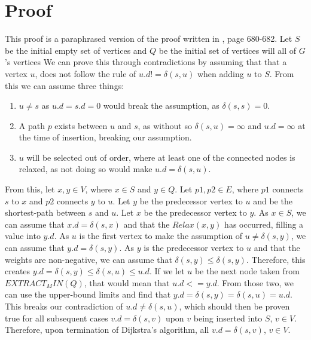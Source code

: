 \documentclass[12pt]{article}
\begin{document}
\section*{Proof}
This proof is a paraphrased version of the proof written in \cite{cormen2009introduction}, page 680-682.  \hfill \break
Let $S$ be the initial empty set of vertices and $Q$ be the initial set of vertices will all of $G$'s vertices
We can prove this through contradictions by assuming that that a vertex $u$, does not follow the rule of $u.d != \delta(s, u)$ when adding $u$ to $S$. From this we can assume three things:

\begin{enumerate}
    \item $u \neq s$ as $u.d = s.d = 0$ would break the assumption, as $\delta(s, s) = 0$.
    \item A path $p$ exists between $u$ and $s$, as without so $\delta(s, u) = \infty$ and $u.d = \infty$ at the time of insertion, breaking our assumption.
    \item $u$ will be selected out of order, where at least one of the connected nodes is relaxed, as not doing so would make $u.d = \delta(s, u)$.
\end{enumerate}
From this, let $x, y \in V$, where $x \in S$ and $y \in Q$. Let $p1, p2 \in E$, where $p1$ connects $s$ to $x$ and $p2$ connects $y$ to $u$. \hfill \break
Let $y$ be the predecessor vertex to $u$ and be the shortest-path between $s$ and $u$. Let $x$ be the predecessor vertex to $y$. \hfill \break
As $x \in S$, we can assume that $x.d = \delta(s, x)$ and that the $Relax(x, y)$ has occurred, filling a value into $y.d$. As $u$ is the first vertex to make the assumption of $u \neq \delta(s, y)$, we can assume that $y.d = \delta(s, y)$. As $y$ is the predecessor vertex to $u$ and that the weights are non-negative, we can assume that $\delta(s, y) \le \delta(s, y)$. Therefore, this creates $y.d = \delta(s, y) \le \delta(s, u) \le u.d$. \hfill \break
If we let $u$ be the next node taken from $EXTRACT_MIN(Q)$, that would mean that $u.d <= y.d$. \hfill \break
From those two, we can use the upper-bound limits and find that $y.d = \delta(s, y) = \delta(s, u) = u.d$. This breaks our contradiction of $u.d \neq \delta(s, u)$, which should then be proven true for all subsequent cases $v.d = \delta(s, v)$ upon $v$ being inserted into $S$, $v \in V$. Therefore, upon termination of Dijkstra’s algorithm, all $v.d = \delta(s, v)$, $v \in V$.
\end{document}
